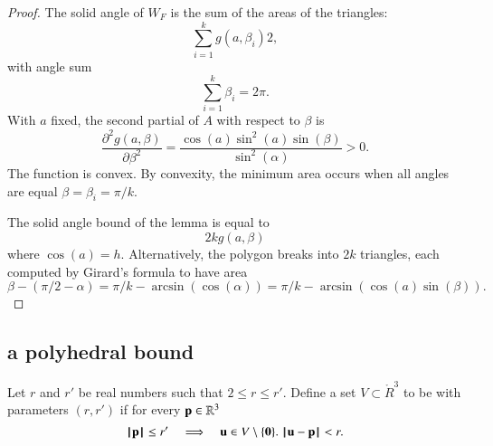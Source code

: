 \begin{proof}
The solid angle of $W_F$ is the sum of the areas of the triangles:
\begin{displaymath}
\sum_{i=1}^k g(a,\beta_i) 2,
\end{displaymath}
with angle sum
\begin{displaymath}
\sum_{i=1}^k \beta_i = 2\pi.
\end{displaymath}
With  $a$ fixed, the second partial of $A$ with respect to $\beta$ is
\begin{displaymath}
\frac{\partial^2 g(a,\beta)}{\partial \beta^2} = \frac{\cos(a)\sin^2(a)\sin(\beta)}{\sin^2(\alpha)} > 0.
\end{displaymath}
The function is convex.
By convexity, the minimum area occurs when all angles are equal
$\beta=\beta_i = \pi/k$.

The solid angle bound of the lemma is equal to 
\begin{displaymath}
2 k g(a,\beta)
\end{displaymath}
where $\cos(a)=h$.
Alternatively, the polygon breaks into $2k$ triangles, each computed by Girard's
formula to have area
\begin{displaymath}
\beta - (\pi/2 - \alpha)  = \pi/k - \arcsin(\cos(\alpha)) = 
\pi/k - \arcsin(\cos(a)\sin(\beta)).
\end{displaymath}
\end{proof}




\subsection{a polyhedral bound}

\begin{definition}
Let $r$ and $r'$ be real numbers such that $2\le r\le r'$.
Define a set $ V\subset\ring{R}^3$ to be  with parameters $(r,r')$ if for every ${\mathbf p}\in\mathbb{R}^3$
\begin{displaymath}
{{\hskip0.1em|\hskip-0.15em|\hskip0.1em}{\mathbf p}{\hskip0.1em|\hskip-0.15em|\hskip0.1em}}\le r'~~~\implies~~~  {\mathbf u}\in V\setminus\{{\mathbf 0}\}.~{\hskip0.1em|\hskip-0.15em|\hskip0.1em} {\mathbf u} - {\mathbf p}{\hskip0.1em|\hskip-0.15em|\hskip0.1em}< r.
\end{displaymath}
\end{definition}

